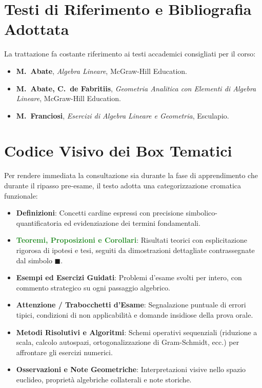 \documentclass[11pt,a4paper,twoside,openright]{book}
\begin{document}
\section*{Testi di Riferimento e Bibliografia Adottata}
La trattazione fa costante riferimento ai testi accademici consigliati per il corso:
\begin{itemize}
    \item \textbf{M.~Abate}, \emph{Algebra Lineare}, McGraw-Hill Education.
    \item \textbf{M.~Abate, C.~de Fabritiis}, \emph{Geometria Analitica con Elementi di Algebra Lineare}, McGraw-Hill Education.
    \item \textbf{M.~Franciosi}, \emph{Esercizi di Algebra Lineare e Geometria}, Esculapio.
\end{itemize}

\section*{Codice Visivo dei Box Tematici}
Per rendere immediata la consultazione sia durante la fase di apprendimento che durante il ripasso pre-esame, il testo adotta una categorizzazione cromatica funzionale:
\begin{itemize}
    \item \textbf{\textcolor{navyblue}{Definizioni}}: Concetti cardine espressi con precisione simbolico-quantificatoria ed evidenziazione dei termini fondamentali.
    \item \textbf{\textcolor{forestgreen}{Teoremi, Proposizioni e Corollari}}: Risultati teorici con esplicitazione rigorosa di ipotesi e tesi, seguiti da dimostrazioni dettagliate contrassegnate dal simbolo $\blacksquare$.
    \item \textbf{\textcolor{purpleaccent}{Esempi ed Esercizi Guidati}}: Problemi d'esame svolti per intero, con commento strategico su ogni passaggio algebrico.
    \item \textbf{\textcolor{crimsonred}{Attenzione / Trabocchetti d'Esame}}: Segnalazione puntuale di errori tipici, condizioni di non applicabilità e domande insidiose della prova orale.
    \item \textbf{\textcolor{warmamber}{Metodi Risolutivi e Algoritmi}}: Schemi operativi sequenziali (riduzione a scala, calcolo autospazi, ortogonalizzazione di Gram-Schmidt, ecc.) per affrontare gli esercizi numerici.
    \item \textbf{\textcolor{navyblue!80}{Osservazioni e Note Geometriche}}: Interpretazioni visive nello spazio euclideo, proprietà algebriche collaterali e note storiche.
\end{itemize}
\end{document}
